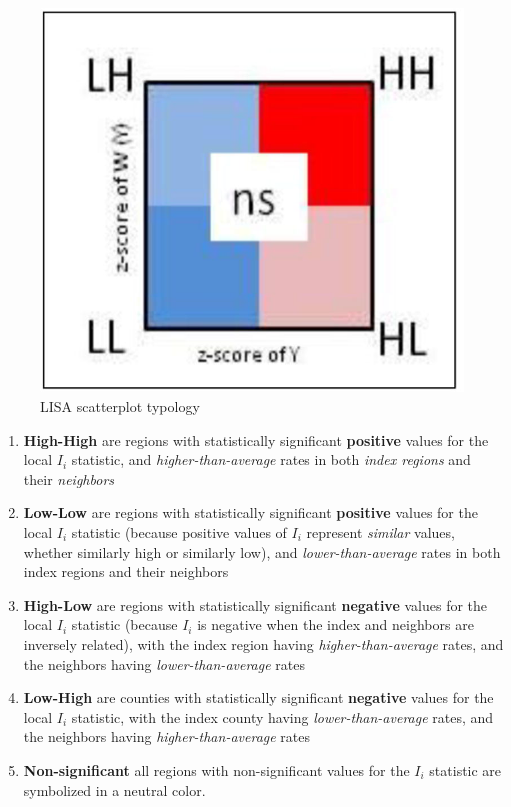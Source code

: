\documentclass[
]{book}
\providecommand{\tightlist}{%
  \setlength{\itemsep}{0pt}\setlength{\parskip}{0pt}}
\begin{document}
\begin{figure}
\centering
\includegraphics{images/lisa-typology.jpg}
\caption{\label{fig:unnamed-chunk-12}LISA scatterplot typology}
\end{figure}

\begin{enumerate}
\def\labelenumi{\arabic{enumi}.}
\tightlist
\item
  \textbf{High-High} are regions with statistically significant \textbf{positive} values for the local \(I_i\) statistic, and \emph{higher-than-average} rates in both \emph{index regions} and their \emph{neighbors}
\item
  \textbf{Low-Low} are regions with statistically significant \textbf{positive} values for the local \(I_i\) statistic (because positive values of \(I_i\) represent \emph{similar} values, whether similarly high or similarly low), and \emph{lower-than-average} rates in both index regions and their neighbors
\item
  \textbf{High-Low} are regions with statistically significant \textbf{negative} values for the local \(I_i\) statistic (because \(I_i\) is negative when the index and neighbors are inversely related), with the index region having \emph{higher-than-average} rates, and the neighbors having \emph{lower-than-average} rates
\item
  \textbf{Low-High} are counties with statistically significant \textbf{negative} values for the local \(I_i\) statistic, with the index county having \emph{lower-than-average} rates, and the neighbors having \emph{higher-than-average} rates
\item
  \textbf{Non-significant} all regions with non-significant values for the \(I_i\) statistic are symbolized in a neutral color.
\end{enumerate}
\end{document}

